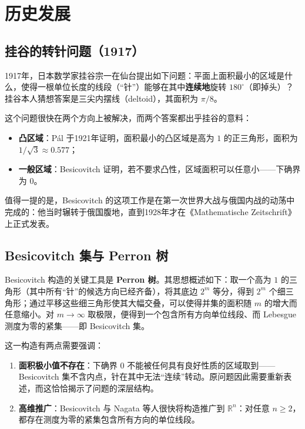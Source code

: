 \section{历史发展}\label{sec:history}

\subsection{挂谷的转针问题（1917）}

1917年，日本数学家挂谷宗一在仙台提出如下问题\cite{kakeya1917}：平面上面积最小的区域是什么，使得一根单位长度的线段（“针”）能够在其中\textbf{连续地}旋转 $180^\circ$（即掉头）？挂谷本人猜想答案是三尖内摆线（deltoid），其面积为 $\pi/8$。

这个问题很快在两个方向上被解决，而两个答案都出乎挂谷的意料：

\begin{itemize}
    \item \textbf{凸区域}：P\'al 于1921年证明，面积最小的凸区域是高为 $1$ 的正三角形，面积为 $1/\sqrt{3} \approx 0.577$\cite{pal1921}；
    \item \textbf{一般区域}：Besicovitch 证明，若不要求凸性，区域面积可以任意小——下确界为 $0$。
\end{itemize}

值得一提的是，Besicovitch 的这项工作是在第一次世界大战与俄国内战的动荡中完成的：他当时辗转于俄国腹地，直到1928年才在《Mathematische Zeitschrift》上正式发表\cite{besicovitch1928}。

\subsection{Besicovitch 集与 Perron 树}

Besicovitch 构造的关键工具是 \textbf{Perron 树}。其思想概述如下：取一个高为 $1$ 的三角形（其中所有“针”的候选方向已经齐备），将其底边 $2^m$ 等分，得到 $2^m$ 个细三角形；通过平移这些细三角形使其大幅交叠，可以使得并集的面积随 $m$ 的增大而任意缩小。对 $m \to \infty$ 取极限，便得到一个包含所有方向单位线段、而 Lebesgue 测度为零的紧集——即 Besicovitch 集。

这一构造有两点需要强调：

\begin{enumerate}[label=(\arabic*)]
    \item \textbf{面积极小值不存在}：下确界 $0$ 不能被任何具有良好性质的区域取到——Besicovitch 集不含内点，针在其中无法“连续”转动。原问题因此需要重新表述，而这恰恰揭示了问题的深层结构。
    \item \textbf{高维推广}：Besicovitch 与 Nagata 等人很快将构造推广到 $\mathbb{R}^n$：对任意 $n \ge 2$，都存在测度为零的紧集包含所有方向的单位线段。
\end{enumerate}

